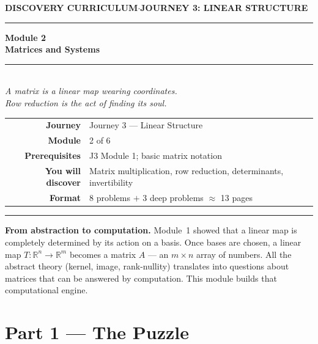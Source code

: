 \documentclass[12pt, a4paper]{article}
\newcounter{problem}
\begin{document}
\thispagestyle{empty}
\begin{center}
{\small\color{MidBlue}\textbf{DISCOVERY CURRICULUM}\quad$\cdot$\quad\textbf{JOURNEY 3: LINEAR STRUCTURE}}
\vspace{0.6cm}

{\color{NavyBlue}\rule{\linewidth}{2pt}}
\vspace{0.5cm}

{\Huge\bfseries\color{NavyBlue}Module 2}\\[0.3cm]
{\LARGE\bfseries\color{MidBlue}Matrices and Systems}\\[0.4cm]
{\color{Gold}\rule{0.4\linewidth}{1.2pt}}\\[0.4cm]
{\large\itshape\color{DarkGrey}
A matrix is a linear map wearing coordinates.\\[0.15cm]
Row reduction is the act of finding its soul.}

\vspace{1cm}
\begin{tabular}{rl}
\color{DarkGrey}\textbf{Journey}     & Journey 3 --- Linear Structure \\[4pt]
\color{DarkGrey}\textbf{Module}      & 2 of 6 \\[4pt]
\color{DarkGrey}\textbf{Prerequisites} & J3 Module 1; basic matrix notation \\[4pt]
\color{DarkGrey}\textbf{You will discover} & Matrix multiplication, row reduction, determinants, invertibility \\[4pt]
\color{DarkGrey}\textbf{Format}      & 8 problems $+$ 3 deep problems $\approx$ 13 pages \\
\end{tabular}
\vspace{1cm}

{\color{NavyBlue}\rule{\linewidth}{2pt}}
\end{center}

\vspace{0.5cm}
\noindent\textbf{From abstraction to computation.}
Module~1 showed that a linear map is completely determined by its action on a basis. Once bases are chosen, a linear map $T : \mathbb{R}^n \to \mathbb{R}^m$ becomes a matrix $A$ --- an $m \times n$ array of numbers. All the abstract theory (kernel, image, rank-nullity) translates into questions about matrices that can be answered by computation. This module builds that computational engine.

\newpage

\section{Part 1 \texorpdfstring{---}{--} The Puzzle}
\end{document}
